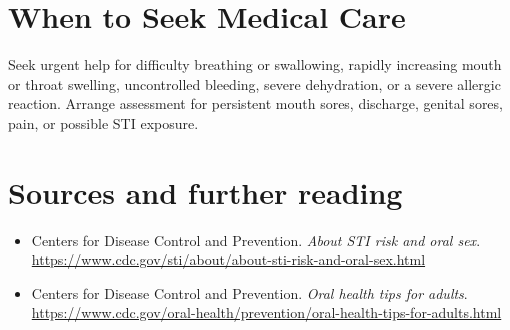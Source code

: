 \section*{When to Seek Medical Care}
Seek urgent help for difficulty breathing or swallowing, rapidly increasing mouth or throat swelling, uncontrolled bleeding, severe dehydration, or a severe allergic reaction. Arrange assessment for persistent mouth sores, discharge, genital sores, pain, or possible STI exposure.

\section*{Sources and further reading}
\begin{itemize}
\item Centers for Disease Control and Prevention. \textit{About STI risk and oral sex}. \url{https://www.cdc.gov/sti/about/about-sti-risk-and-oral-sex.html}
\item Centers for Disease Control and Prevention. \textit{Oral health tips for adults}. \url{https://www.cdc.gov/oral-health/prevention/oral-health-tips-for-adults.html}
\end{itemize}
